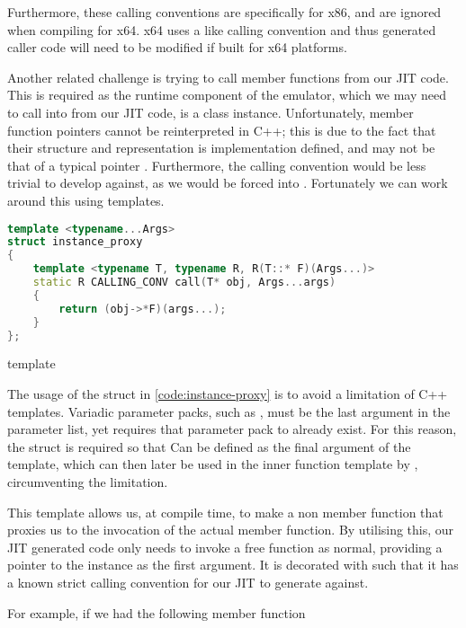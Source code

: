 Furthermore, these calling conventions are specifically for x86, and are ignored when compiling for x64. x64 uses a  like calling convention \cite{msvc-x64-calling-conv} and thus generated caller code will need to be modified if built for x64 platforms.

Another related challenge is trying to call member functions from our JIT code. This is required as the runtime component of the emulator, which we may need to call into from our JIT code, is a class instance. Unfortunately, member function pointers cannot be reinterpreted in C++; this is due to the fact that their structure and representation is implementation defined, and may not be that of a typical pointer \cite{ptrs_to_member_funcs}. Furthermore, the calling convention would be less trivial to develop against, as we would be forced into . Fortunately we can work around this using templates.

\begin{lstfloat}[H]
    \begin{lstlisting}[language=c++]
template <typename...Args>
struct instance_proxy
{
    template <typename T, typename R, R(T::* F)(Args...)>
    static R CALLING_CONV call(T* obj, Args...args)
    {
        return (obj->*F)(args...);
    }
};
    \end{lstlisting}
    \caption{ template}
    \label{code:instance-proxy}
\end{lstfloat}

The usage of the struct in \autoref{code:instance-proxy} is to avoid a limitation of C++ templates. Variadic parameter packs, such as , must be the last argument in the parameter list, yet  requires that parameter pack to already exist. For this reason, the struct is required so that  Can be defined as the final argument of the template, which can then later be used in the inner function template by , circumventing the limitation.

This template allows us, at compile time, to make a non member function that proxies us to the invocation of the actual member function. By utilising this, our JIT generated code only needs to invoke a free function as normal, providing a pointer to the instance as the first argument. It is decorated with  such that it has a known strict calling convention for our JIT to generate against.

For example, if we had the following member function

